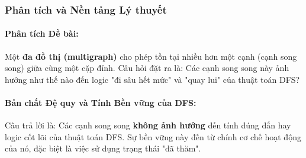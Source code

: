 \documentclass[a4paper,12pt]{article}
\begin{document}
\subsubsection{Phân tích và Nền tảng Lý thuyết}
\paragraph{Phân tích Đề bài:}
Một \textbf{đa đồ thị (multigraph)} cho phép tồn tại nhiều hơn một cạnh (cạnh song song) giữa cùng một cặp đỉnh. Câu hỏi đặt ra là: Các cạnh song song này ảnh hưởng như thế nào đến logic "đi sâu hết mức" và "quay lui" của thuật toán DFS?

\paragraph{Bản chất Đệ quy và Tính Bền vững của DFS:}
Câu trả lời là: Các cạnh song song \textbf{không ảnh hưởng} đến tính đúng đắn hay logic cốt lõi của thuật toán DFS. Sự bền vững này đến từ chính cơ chế hoạt động của nó, đặc biệt là việc sử dụng trạng thái "đã thăm".
\end{document}
